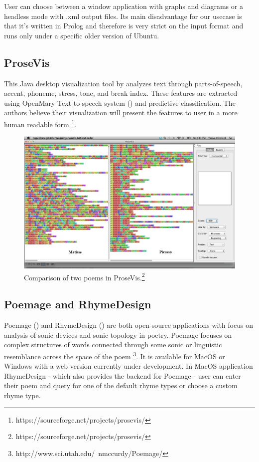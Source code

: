 User can choose between a window application with graphs and diagrams or a headless mode with .xml output files. Its main disadvantage for our usecase is that it's written in Prolog and therefore is very strict on the input format and runs only under a specific older version of Ubuntu. 

\subsection{ProseVis}
This Java desktop visualization tool by \cite{Clement2013} analyzes text through
parts-of-speech, accent, phoneme, stress, tone, and break index. These features are extracted using OpenMary Text-to-speech system (\cite{Schroder2006}) and predictive classification. The authors believe their visualization will present the features to user in a more human readable form \footnote{https://sourceforge.net/projects/prosevis/}.

\begin{figure}[h]\centering
	\includegraphics[scale=0.24]{../img/prosevis.png}
	\caption{Comparison of two poems in ProseVis.\protect\footnote{https://sourceforge.net/projects/prosevis/}}\label{screenshotProsevis}
\end{figure}

\subsection{Poemage and RhymeDesign}
Poemage (\cite{McCurdy2015poemage}) and RhymeDesign (\cite{McCurdy2015}) are both open-source applications with focus on analysis of sonic devices and sonic topology in poetry. Poemage focuses on complex structures of words connected through some sonic or linguistic resemblance across the space of the poem \footnote{http://www.sci.utah.edu/~nmccurdy/Poemage/}. It is available for MacOS or Windows with a web version currently under development. In MacOS application RhymeDesign - which also provides the backend for Poemage - user can enter their poem and query for one of the default rhyme types or choose a custom rhyme type.

